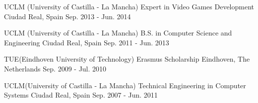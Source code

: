 

\begin{cventries}

  \cveduentry
    {UCLM (University of Castilla - La Mancha)} %
    {Expert in Video Games Development} %
    {Ciudad Real, Spain} %
    {Sep. 2013 - Jun. 2014} %
    {}

  \cveduentry
    {UCLM (University of Castilla - La Mancha)} %
    {B.S. in Computer Science and Engineering} %
    {Ciudad Real, Spain} %
    {Sep. 2011 - Jun. 2013} %
   {}


  \cveduentry
    {TUE(Eindhoven University of Technology)} %
    {Erasmus Scholarship} %
    {Eindhoven, The Netherlands} %
    {Sep. 2009 - Jul. 2010} %
    {}

  \cveduentry
    {UCLM(University of Castilla - La Mancha)} %
    {Technical Engineering in Computer Systems} %
    {Ciudad Real, Spain} %
    {Sep. 2007 - Jun. 2011} %
    {}
\end{cventries}
